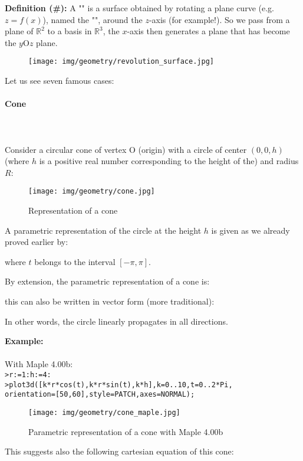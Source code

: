 {	\textbf{Definition (\#\mydef):} A "" is a surface obtained by rotating a plane curve (e.g. $z=f(x)$), named the "", around the $z$-axis (for example!). So we pass from a plane of $\mathbb{R}^2$ to a basis in $\mathbb{R}^3$, the $x$-axis then generates a plane that has become the $y$O$z$ plane.
	\begin{figure}[H]
		\centering
		\texttt{[image: img/geometry/revolution\_surface.jpg]}
	\end{figure}
	Let us see seven famous cases:
	
	\paragraph{Cone}\label{cone of revolution}\mbox{}\\\\
	Consider a circular cone of vertex O (origin) with a circle of center $(0,0, h)$ (where $h$ is a positive real number corresponding to the height of the) and radius $R$:
	\begin{figure}[H]
		\centering
		\texttt{[image: img/geometry/cone.jpg]}
		\caption{Representation of a cone}
	\end{figure}
	A parametric representation of the circle at the height $h$ is given as we already proved earlier by:
	
	where $t$ belongs to the interval $[-\pi,\pi]$.
	
	By extension, the parametric representation of a cone is:
	
	this can also be written in vector form (more traditional):
	
	
	In other words, the circle linearly propagates in all directions.
	\begin{tcolorbox}[colframe=black,colback=white,sharp corners]
	\textbf{{\Large {}}Example:}\\\\
	With Maple 4.00b:\\

	\texttt{>r:=1:h:=4:\\
	>plot3d([k*r*cos(t),k*r*sin(t),k*h],k=0..10,t=0..2*Pi,\\
	orientation=[50,60],style=PATCH,axes=NORMAL);
	}
	\begin{figure}[H]
		\centering
		\texttt{[image: img/geometry/cone\_maple.jpg]}
		\caption{Parametric representation of a cone with Maple 4.00b}
	\end{figure}
	\end{tcolorbox}
	This suggests also the following cartesian equation of this cone:
	
}
